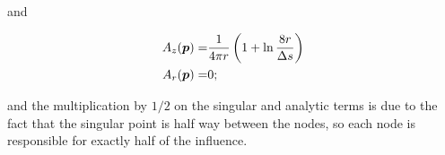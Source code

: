 \noindent and

\begin{equation}
    \begin{aligned}
    A_z(\bm{p}) =& \frac{1}{4\pi r} \left( 1 + \ln\frac{8 r}{\Delta s}\right) \\
    A_r(\bm{p}) =& 0;
    \end{aligned}
\end{equation}

\noindent and the multiplication by \(1/2\) on the singular and analytic terms is due to the fact that the singular point is half way between the nodes, so each node is responsible for exactly half of the influence.


